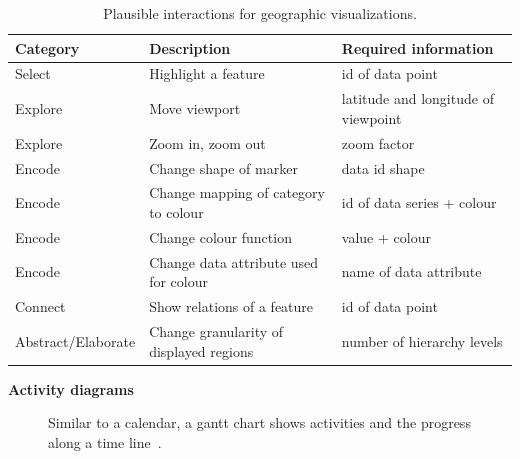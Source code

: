 \begin{table}[H]
  \begin{tabular*}{\textwidth}{lll}
    \bf Category & \bf Description & \bf Required information \\
    \hline
    Select & Highlight a feature & id of data point \\
    Explore & Move viewport & latitude and longitude of viewpoint \\
    Explore & Zoom in, zoom out & zoom factor \\
    Encode & Change shape of marker & data id  shape \\
    Encode & Change mapping of category to colour & id of data series + colour \\
    Encode & Change colour function & value + colour \\
    Encode & Change data attribute used for colour & name of data attribute \\
    Connect & Show relations of a feature & id of data point  \\
    Abstract/Elaborate & Change granularity of displayed regions & number of hierarchy levels \\
  \end{tabular*}
  \caption{Plausible interactions for geographic visualizations.}%
  \label{tab:analysis:geographical:interactions}
\end{table}

\textbf{Activity diagrams}
\begin{figure}
  \centering
  \qquad
  \caption{Similar to a calendar, a gantt chart shows activities and the progress along a time line~\parencite{VisualizationCatalogue2017}.}%
  \label{fig:analysis:temporal}
\end{figure}

